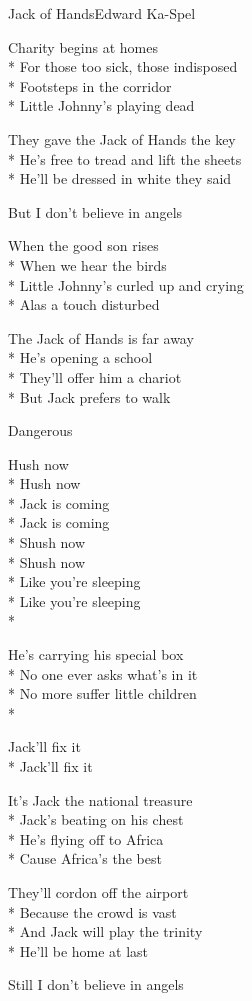 \documentclass[10.5pt]{book}
\begin{document}
\begin{poem}{Jack of Hands}{Edward Ka-Spel}

\settowidth{\versewidth}{He’s free to tread and lift the sheets}

Charity begins at homes\\*
For those too sick, those indisposed \\*
Footsteps in the corridor \\*
Little Johnny’s playing dead

They gave the Jack of Hands the key \\*
He’s free to tread and lift the sheets \\*
He’ll be dressed in white they said

But I don’t believe in angels

When the good son rises \\*
When we hear the birds \\*
Little Johnny's curled up and crying \\*
Alas a touch disturbed

The Jack of Hands is far away \\*
He’s opening a school \\*
They’ll offer him a chariot \\*
But Jack prefers to walk 

Dangerous

\vfill\eject

\begin{altverse}
Hush now \\*
Hush now \\*
Jack is coming \\*
Jack is coming \\*
Shush now \\*
Shush now \\*
Like you’re sleeping \\*
Like you’re sleeping\\*
\end{altverse}
He’s carrying his special box \\*
No one ever asks what’s in it \\*
No more suffer little children \\*
\begin{altverse}
Jack’ll fix it \\*
Jack’ll fix it 
\end{altverse}


It’s Jack the national treasure \\*
Jack’s beating on his chest \\*
He’s flying off to Africa \\*
Cause Africa’s the best 

They’ll cordon off the airport \\*
Because the crowd is vast \\*
And Jack will play the trinity \\*
He’ll be home at last 

Still I don’t believe in angels

\end{poem}
\end{document}
